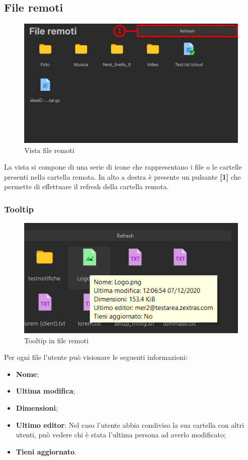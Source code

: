 \subsection{File remoti}
\label{sec:fileRemoti}
\begin{figure}[H]
    \centering
    \includegraphics[scale = 0.8]{components/img/fileRem.png}
    \caption{Vista file remoti}
    \label{fig:fileRem}
\end{figure}
La vista si compone di una serie di icone che rappresentano i file o le cartelle presenti nella cartella remota. In alto a destra è presente un pulsante \textbf{[1]} che permette di effettuare il refresh della cartella remota.

\subsubsection{Tooltip}
\label{sec:fileRemotiTooltip}
\begin{figure}[H]
    \centering
    \includegraphics[scale = 0.8]{components/img/fileRem_tooltip.png}
    \caption{Tooltip in file remoti}
    \label{fig:fileRemotiTooltip}
\end{figure}
Per ogni file l'utente può visionare le seguenti informazioni:
\begin{itemize}
    \item \textbf{Nome};
    \item \textbf{Ultima modifica};
    \item \textbf{Dimensioni};
    \item \textbf{Ultimo editor}: Nel caso l'utente abbia condiviso la sua cartella con altri utenti, può vedere chi è stata l'ultima persona ad averlo modificato;
    \item \textbf{Tieni aggiornato}.
\end{itemize}

